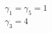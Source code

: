 \documentclass[preview]{standalone}
\begin{document}
\begin{center}
$\gamma_1 = \gamma_5 = 1$\\$\gamma_3 = 4$
\end{center}
\end{document}
